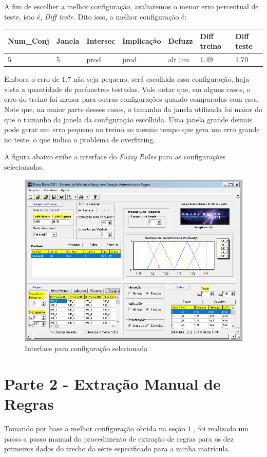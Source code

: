 \documentclass[12pt]{article}
\begin{document}
A fim de escolher a melhor configuração, avaliaremos o menor erro percentual de teste, isto é, \textit{Diff teste}. Dito isso, a melhor configuração é:
\begin{table}[H]
	\centering
	\begin{tabular}{|l|l|l|l|l|l|l|}
		\hline
		Num\_Conj & Janela & Intersec & Implicação & Defuzz  & Diff treino & Diff teste \\ \hline
		5         & 5      & prod     & prod       & alt lim & 1.49        & 1.70       \\ \hline
	\end{tabular}
\end{table}

Embora o erro de $1.7$ não seja pequeno, será escolhida essa configuração, haja vista a quantidade de parâmetros testadas. Vale notar que, em alguns casos, o erro do treino foi menor para outras configurações quando comparadas com essa. Note que, na maior parte desses casos, o tamanho da janela utilizada foi maior do que o tamanho da janela da configuração escolhida. Uma janela grande demais pode gerar um erro pequeno no treino ao mesmo tempo que gera um erro grande no teste, o que indica o problema de overfitting.

A figura abaixo exibe a interface do \textit{Fuzzy Rules} para as configurações selecionadas.
\begin{figure}[H]
	\centering
	\includegraphics[width=0.7\linewidth]{Imagens/resultadoTeste_TUDO}
	\caption{Interface para configuração selecionada}
	\label{fig:resultadotestetudo}
\end{figure}



\section{Parte 2 - Extração Manual de Regras}
Tomando por base a melhor configuração obtida na seção 1 , foi realizado um passo a passo manual do procedimento de extração de regras para os dez primeiros dados do trecho da série especificado para a minha matrícula.
\end{document}
